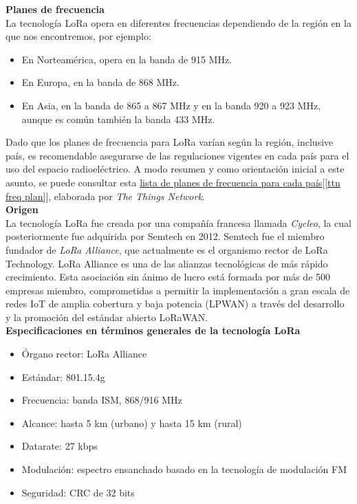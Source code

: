 \documentclass[12pt]{article}
\begin{document}
	\noindent \textbf{Planes de frecuencia} \\
	
	\noindent La tecnología LoRa opera en diferentes frecuencias dependiendo de la región en la que nos encontremos, por ejemplo: 
	
	\begin{itemize}
		\item En Norteamérica, opera en la banda de 915 MHz.
		\item En Europa, en la banda de 868 MHz.
		\item En Asia, en la banda de 865 a 867 MHz y en la banda 920 a 923 MHz, aunque es común también la banda 433 MHz.
	\end{itemize}
	
	\noindent Dado que los planes de frecuencia para LoRa varían según la región, inclusive país, es recomendable asegurarse de las regulaciones vigentes en cada país para el uso del espacio radioeléctrico. A modo resumen y como orientación inicial a este asunto, se puede consultar esta \href{https://www.thethingsnetwork.org/docs/lorawan/frequencies-by-country/index.html}{lista de planes de frecuencia para cada país}[\ref{ttn freq plan}], elaborada por \textit{The Things Network}. \\
	
	\noindent \textbf{Origen} \\
	
	\noindent La tecnología LoRa fue creada por una compañía francesa llamada \textit{Cycleo}, la cual posteriormente fue adquirida por Semtech en 2012. Semtech fue el miembro fundador de \textit{LoRa Alliance}, que actualmente es el organismo rector de LoRa Technology. LoRa Alliance es una de las alianzas tecnológicas de más rápido crecimiento. Esta asociación sin ánimo de lucro está formada por más de 500 empresas miembro, comprometidas a permitir la implementación a gran escala de redes IoT de amplia cobertura y baja potencia (LPWAN) a través del desarrollo y la promoción del estándar abierto LoRaWAN.\\
	
	\noindent \textbf{Especificaciones en términos generales de la tecnología LoRa}
	
	\begin{itemize}
		\item Órgano rector: LoRa Alliance
		\item Estándar: 801.15.4g
		\item Frecuencia: banda ISM, 868/916 MHz
		\item Alcance: hasta 5 km (urbano) y hasta 15 km (rural)
		\item Datarate: 27 kbps
		\item Modulación: espectro ensanchado basado en la tecnología de modulación FM
		\item Seguridad: CRC de 32 bits
	\end{itemize}
	 
\end{document}
